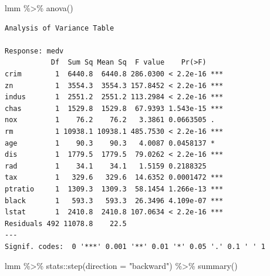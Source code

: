 \documentclass[
  letterpaper,
  DIV=11,
  numbers=noendperiod]{scrreprt}
\newenvironment{Shaded}{\begin{snugshade}}{\end{snugshade}}
\newcommand{\AttributeTok}[1]{\textcolor[rgb]{0.65,0.35,0.00}{#1}}
\newcommand{\FunctionTok}[1]{\textcolor[rgb]{0.02,0.16,0.49}{#1}}
\newcommand{\NormalTok}[1]{\textcolor[rgb]{0.33,0.33,0.33}{#1}}
\newcommand{\SpecialCharTok}[1]{\textcolor[rgb]{0.00,0.46,0.62}{#1}}
\newcommand{\StringTok}[1]{\textcolor[rgb]{0.00,0.50,0.00}{#1}}
\begin{document}
\begin{Shaded}
\begin{Highlighting}[]
\NormalTok{lmm }\SpecialCharTok{\%\textgreater{}\%} \FunctionTok{anova}\NormalTok{()}
\end{Highlighting}
\end{Shaded}

\begin{verbatim}
Analysis of Variance Table

Response: medv
           Df  Sum Sq Mean Sq  F value    Pr(>F)    
crim        1  6440.8  6440.8 286.0300 < 2.2e-16 ***
zn          1  3554.3  3554.3 157.8452 < 2.2e-16 ***
indus       1  2551.2  2551.2 113.2984 < 2.2e-16 ***
chas        1  1529.8  1529.8  67.9393 1.543e-15 ***
nox         1    76.2    76.2   3.3861 0.0663505 .  
rm          1 10938.1 10938.1 485.7530 < 2.2e-16 ***
age         1    90.3    90.3   4.0087 0.0458137 *  
dis         1  1779.5  1779.5  79.0262 < 2.2e-16 ***
rad         1    34.1    34.1   1.5159 0.2188325    
tax         1   329.6   329.6  14.6352 0.0001472 ***
ptratio     1  1309.3  1309.3  58.1454 1.266e-13 ***
black       1   593.3   593.3  26.3496 4.109e-07 ***
lstat       1  2410.8  2410.8 107.0634 < 2.2e-16 ***
Residuals 492 11078.8    22.5                       
---
Signif. codes:  0 '***' 0.001 '**' 0.01 '*' 0.05 '.' 0.1 ' ' 1
\end{verbatim}

\begin{Shaded}
\begin{Highlighting}[]
\NormalTok{lmm }\SpecialCharTok{\%\textgreater{}\%}\NormalTok{ stats}\SpecialCharTok{::}\FunctionTok{step}\NormalTok{(}\AttributeTok{direction =} \StringTok{"backward"}\NormalTok{) }\SpecialCharTok{\%\textgreater{}\%} \FunctionTok{summary}\NormalTok{()}
\end{Highlighting}
\end{Shaded}
\end{document}
